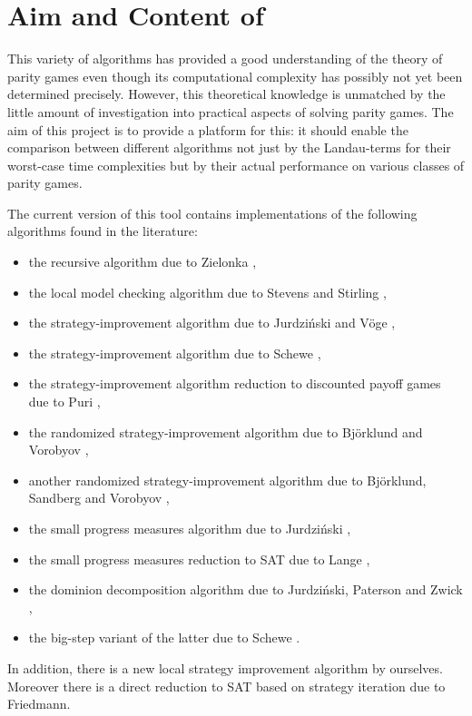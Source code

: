 \section{Aim and Content of \pgsolver}

This variety of algorithms has provided a good understanding of the theory of parity games even though
its computational complexity has possibly not yet been determined precisely. However, this theoretical
knowledge is unmatched by the little amount of investigation into practical aspects of solving parity
games. The aim of this project is to provide a platform for this: it should enable the comparison
between different algorithms not just by the Landau-terms for their worst-case time complexities but
by their actual performance on various classes of parity games.

The current version of this tool contains implementations of the following algorithms found in
the literature:
\begin{itemize}
\item the recursive algorithm due to Zielonka \cite{TCS::Zielonka1998},
\item the local model checking algorithm due to Stevens and Stirling \cite{StevensStirling98},
\item the strategy-improvement algorithm due to Jurdzi{\'n}ski and V\"oge \cite{conf/cav/VogeJ00},
\item the strategy-improvement algorithm due to Schewe \cite{conf/csl/Schewe08},
\item the strategy-improvement algorithm reduction to discounted payoff games due to Puri \cite{purithesis},
\item the randomized strategy-improvement algorithm due to Bj{\"o}rklund and Vorobyov \cite{BjoerklundVorobyov/2007},
\item another randomized strategy-improvement algorithm due to Bj{\"o}rklund, Sandberg and Vorobyov \cite{DBLP:conf/stacs/BjorklundSV03},
\item the small progress measures algorithm due to Jurdzi{\'n}ski \cite{Jurdzinski/00},
\item the small progress measures reduction to SAT due to Lange \cite{lange-gdv05},
\item the dominion decomposition algorithm due to Jurdzi{\'n}ski, Paterson and Zwick \cite{JPZ06},
\item the big-step variant of the latter due to Schewe \cite{Schewe/07/Parity}.
\end{itemize}
In addition, there is a new local strategy improvement algorithm by ourselves. Moreover
there is a direct reduction to SAT based on strategy iteration due to Friedmann.

